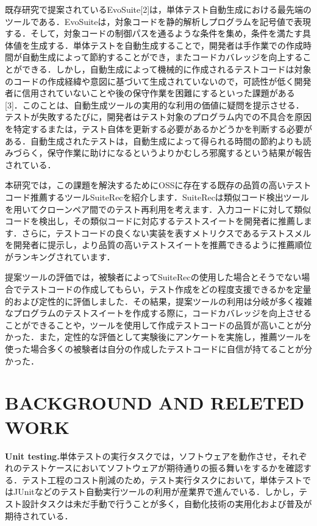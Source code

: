 \documentclass[conference]{IEEEtran}
\begin{document}
既存研究で提案されているEvoSuite[2]は，単体テスト自動生成における最先端のツールである．EvoSuiteは，対象コードを静的解析しプログラムを記号値で表現する．そして，対象コードの制御パスを通るような条件を集め，条件を満たす具体値を生成する．単体テストを自動生成することで，開発者は手作業での作成時間が自動生成によって節約することができ，またコードカバレッジを向上することができる．しかし，自動生成によって機械的に作成されるテストコードは対象のコードの作成経緯や意図に基づいて生成されていないので，可読性が低く開発者に信用されていないことや後の保守作業を困難にするといった課題がある[3]．このことは、自動生成ツールの実用的な利用の価値に疑問を提示させる．テストが失敗するたびに，開発者はテスト対象のプログラム内での不具合を原因を特定するまたは，テスト自体を更新する必要があるかどうかを判断する必要がある．自動生成されたテストは，自動生成によって得られる時間の節約よりも読みづらく，保守作業に助けになるというよりかむしろ邪魔するという結果が報告されている．

本研究では，この課題を解決するためにOSSに存在する既存の品質の高いテストコード推薦するツールSuiteRecを紹介します．SuiteRecは類似コード検出ツールを用いてクローンペア間でのテスト再利用を考えます．入力コードに対して類似コードを検出し，その類似コードに対応するテストスイートを開発者に推薦します．さらに，テストコードの良くない実装を表すメトリクスであるテストスメルを開発者に提示し，より品質の高いテストスイートを推薦できるように推薦順位がランキングされています．

提案ツールの評価では，被験者によってSuiteRecの使用した場合とそうでない場合でテストコードの作成してもらい，テスト作成をどの程度支援できるかを定量的および定性的に評価しました．その結果，提案ツールの利用は分岐が多く複雑なプログラムのテストスイートを作成する際に，コードカバレッジを向上させることができることや，ツールを使用して作成テストコードの品質が高いことが分かった．また，定性的な評価として実験後にアンケートを実施し，推薦ツールを使った場合多くの被験者は自分の作成したテストコードに自信が持てることが分かった．



\section{BACKGROUND AND RELETED WORK}
\textbf{Unit testing.}単体テストの実行タスクでは，ソフトウェアを動作させ，それぞれのテストケースにおいてソフトウェアが期待通りの振る舞いをするかを確認する．テスト工程のコスト削減のため，テスト実行タスクにおいて，単体テストではJUnitなどのテスト自動実行ツールの利用が産業界で進んでいる．しかし，テスト設計タスクは未だ手動で行うことが多く，自動化技術の実用化および普及が期待されている．
\end{document}
